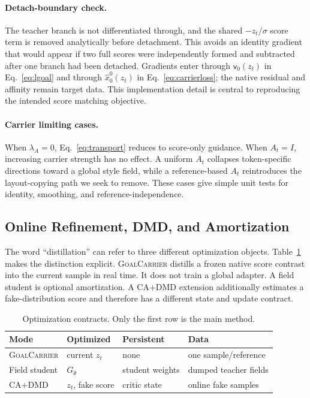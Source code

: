 \documentclass[10pt,letterpaper]{article}
\newcommand{\method}{\textsc{GoalCarrier}}
\newcommand{\vel}{\mathsf{v}}
\begin{document}
\paragraph{Detach-boundary check.}
The teacher branch is not differentiated through, and the shared
$-z_t/\sigma$ score term is removed analytically before detachment. This avoids
an identity gradient that would appear if two full scores were independently
formed and subtracted after one branch had been detached. Gradients enter
through $\vel_0(z_t)$ in Eq.~\ref{eq:lgoal} and through $\hat x_0^0(z_t)$ in
Eq.~\ref{eq:carrierloss}; the native residual and affinity remain target data.
This implementation detail is central to reproducing the intended score
matching objective.

\paragraph{Carrier limiting cases.}
When $\lambda_A=0$, Eq.~\ref{eq:transport} reduces to score-only guidance. When
$A_t=I$, increasing carrier strength has no effect. A uniform $A_t$ collapses
token-specific directions toward a global style field, while a reference-based
$A_t$ reintroduces the layout-copying path we seek to remove. These cases give
simple unit tests for identity, smoothing, and reference-independence.

\subsection{Online Refinement, DMD, and Amortization}

The word ``distillation'' can refer to three different optimization objects.
Table~\ref{tab:modes} makes the distinction explicit. \method{} distills a frozen
native score contrast into the current sample in real time. It does not train a
global adapter. A field student is optional amortization. A CA+DMD extension
additionally estimates a fake-distribution score and therefore has a different
state and update contract.

\begin{table}[t]
\centering
\caption{Optimization contracts. Only the first row is the main method.}
\label{tab:modes}
\small
\setlength{\tabcolsep}{3pt}
\begin{tabular}{llll}
\toprule
Mode & Optimized & Persistent & Data\\
\midrule
\method & current $z_t$ & none & one sample/reference\\
Field student & $G_\theta$ & student weights & dumped teacher fields\\
CA+DMD & $z_t$, fake score & critic state & online fake samples\\
\bottomrule
\end{tabular}
\end{table}
\end{document}
